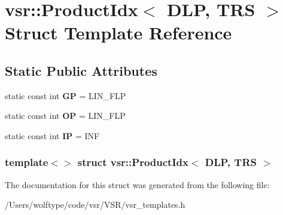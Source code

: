 \hypertarget{structvsr_1_1_product_idx_3_01_d_l_p_00_01_t_r_s_01_4}{\section{vsr\-:\-:Product\-Idx$<$ D\-L\-P, T\-R\-S $>$ Struct Template Reference}
\label{structvsr_1_1_product_idx_3_01_d_l_p_00_01_t_r_s_01_4}
}
\subsection*{Static Public Attributes}
\begin{DoxyCompactItemize}
\item 
\hypertarget{structvsr_1_1_product_idx_3_01_d_l_p_00_01_t_r_s_01_4_a0a277ece49d14dc4b1dd84f059c08859}{static const int {\bfseries G\-P} = L\-I\-N\-\_\-\-F\-L\-P}\label{structvsr_1_1_product_idx_3_01_d_l_p_00_01_t_r_s_01_4_a0a277ece49d14dc4b1dd84f059c08859}

\item 
\hypertarget{structvsr_1_1_product_idx_3_01_d_l_p_00_01_t_r_s_01_4_a0ea96144cd98cc909c233add13cc71d0}{static const int {\bfseries O\-P} = L\-I\-N\-\_\-\-F\-L\-P}\label{structvsr_1_1_product_idx_3_01_d_l_p_00_01_t_r_s_01_4_a0ea96144cd98cc909c233add13cc71d0}

\item 
\hypertarget{structvsr_1_1_product_idx_3_01_d_l_p_00_01_t_r_s_01_4_af8dc213febce2ee41e9fd503ddb5c1e5}{static const int {\bfseries I\-P} = I\-N\-F}\label{structvsr_1_1_product_idx_3_01_d_l_p_00_01_t_r_s_01_4_af8dc213febce2ee41e9fd503ddb5c1e5}

\end{DoxyCompactItemize}
\subsubsection*{template$<$$>$ struct vsr\-::\-Product\-Idx$<$ D\-L\-P, T\-R\-S $>$}



The documentation for this struct was generated from the following file\-:\begin{DoxyCompactItemize}
\item 
/\-Users/wolftype/code/vsr/\-V\-S\-R/vsr\-\_\-templates.\-h\end{DoxyCompactItemize}
